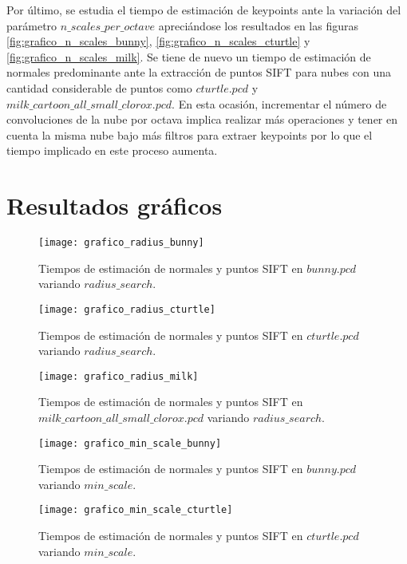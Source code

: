 Por último, se estudia el tiempo de estimación de keypoints ante la variación del parámetro $n\_scales\_per\_octave$ apreciándose los resultados en las figuras \ref{fig:grafico_n_scales_bunny}, \ref{fig:grafico_n_scales_cturtle} y \ref{fig:grafico_n_scales_milk}. Se tiene de nuevo un tiempo de estimación de normales predominante ante la extracción de puntos SIFT para nubes con una cantidad considerable de puntos como $cturtle.pcd$ y $milk\_cartoon\_all\_small\_clorox.pcd$. En esta ocasión, incrementar el número de convoluciones de la nube por octava implica realizar más operaciones y tener en cuenta la misma nube bajo más filtros para extraer keypoints por lo que el tiempo implicado en este proceso aumenta.


\section{Resultados gráficos}

\begin{figure}[h!]
\centering
\texttt{[image: grafico\_radius\_bunny]}
\caption{Tiempos de estimación de normales y puntos SIFT en $bunny.pcd$ variando $radius\_search$.}\label{fig:grafico_radius_bunny}
\end{figure}

\begin{figure}[h!]
\centering
\texttt{[image: grafico\_radius\_cturtle]}
\caption{Tiempos de estimación de normales y puntos SIFT en $cturtle.pcd$ variando $radius\_search$.}\label{fig:grafico_radius_cturtle}
\end{figure}


\begin{figure}[h!]
\centering
\texttt{[image: grafico\_radius\_milk]}
\caption{Tiempos de estimación de normales y puntos SIFT en $milk\_cartoon\_all\_small\_clorox.pcd$ variando $radius\_search$.}\label{fig:grafico_radius_milk}
\end{figure}


\begin{figure}[h!]
\centering
\texttt{[image: grafico\_min\_scale\_bunny]}
\caption{Tiempos de estimación de normales y puntos SIFT en $bunny.pcd$ variando $min\_scale$.}\label{fig:grafico_min_scale_bunny}
\end{figure}

\begin{figure}[h!]
\centering
\texttt{[image: grafico\_min\_scale\_cturtle]}
\caption{Tiempos de estimación de normales y puntos SIFT en $cturtle.pcd$ variando $min\_scale$.}\label{fig:grafico_min_scale_cturtle}
\end{figure}



